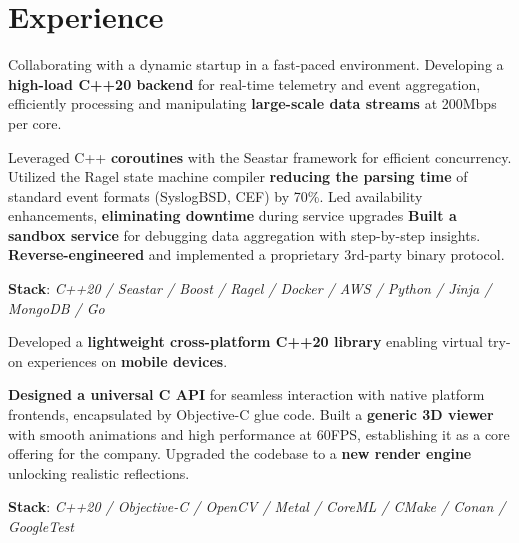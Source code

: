 \documentclass[]{deedy-resume}
\begin{document}
\begin{minipage}[t]{0.70\textwidth}


\section{Experience}


Collaborating with a dynamic startup in a fast-paced environment.
Developing a \textbf{high-load C++20 backend} for real-time telemetry and event aggregation, efficiently processing and manipulating \textbf{large-scale data streams} at 200Mbps per core.
\begin{descritemize}
    \descritem Leveraged C++ \textbf{coroutines} with the Seastar framework for efficient concurrency.
    \descritem Utilized the Ragel state machine compiler \textbf{reducing the parsing time} of standard event formats (SyslogBSD, CEF) by 70\%.
    \descritem Led availability enhancements, \textbf{eliminating downtime} during service upgrades
    \descritem \textbf{Built a sandbox service} for debugging data aggregation with step-by-step insights.
    \descritem \textbf{Reverse-engineered} and implemented a proprietary 3rd-party binary protocol.
\end{descritemize}
\textbf{Stack}: \textit{C++20 / Seastar / Boost / Ragel / Docker / AWS / Python / Jinja / MongoDB / Go}

\sectionspace



Developed a \textbf{lightweight cross-platform C++20 library} enabling virtual try-on experiences on \textbf{mobile devices}.
\begin{descritemize}
    \descritem \textbf{Designed a universal C API} for seamless interaction with native platform frontends, encapsulated by Objective-C glue code.
    \descritem Built a \textbf{generic 3D viewer} with smooth animations and high performance at 60FPS, establishing it as a core offering for the company.
    \descritem Upgraded the codebase to a \textbf{new render engine} unlocking realistic reflections.
\end{descritemize}
\textbf{Stack}: \textit{C++20 / Objective-C / OpenCV / Metal / CoreML / CMake / Conan / GoogleTest}


\end{minipage}
\end{document}
